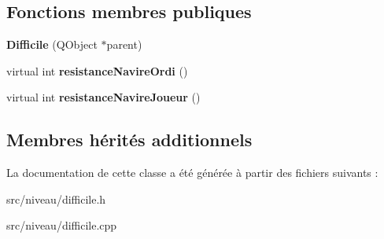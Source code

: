 \subsection*{Fonctions membres publiques}
\begin{DoxyCompactItemize}
\item 
{\bfseries Difficile} (Q\+Object $\ast$parent)\hypertarget{class_difficile_a0231ef40e1ded703a0cdfdf19eb91514}{}\label{class_difficile_a0231ef40e1ded703a0cdfdf19eb91514}

\item 
virtual int {\bfseries resistance\+Navire\+Ordi} ()\hypertarget{class_difficile_af3a6bab0cdcd63d9be464c0c4e07cb66}{}\label{class_difficile_af3a6bab0cdcd63d9be464c0c4e07cb66}

\item 
virtual int {\bfseries resistance\+Navire\+Joueur} ()\hypertarget{class_difficile_ab9b40f803d46477a49db5c7ad4974436}{}\label{class_difficile_ab9b40f803d46477a49db5c7ad4974436}

\end{DoxyCompactItemize}
\subsection*{Membres hérités additionnels}


La documentation de cette classe a été générée à partir des fichiers suivants \+:\begin{DoxyCompactItemize}
\item 
src/niveau/difficile.\+h\item 
src/niveau/difficile.\+cpp\end{DoxyCompactItemize}
